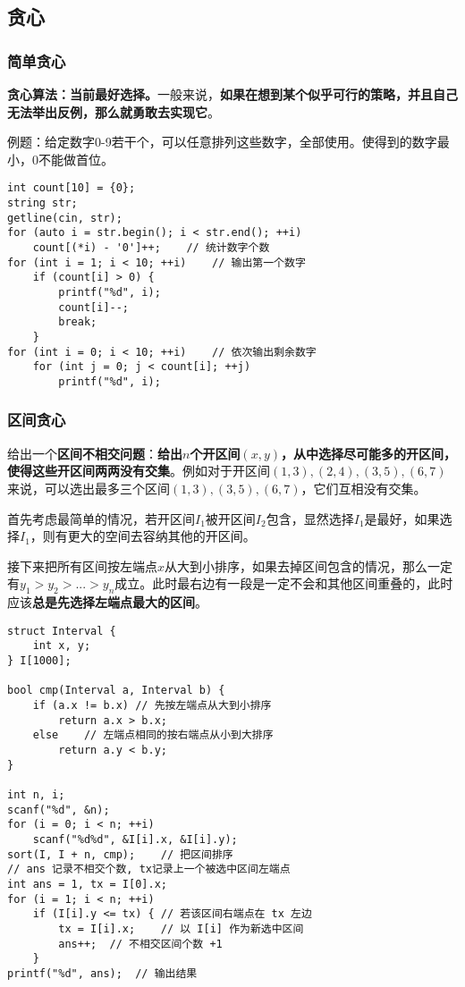 \subsection{贪心}

\subsubsection{简单贪心}

\textbf{贪心算法：当前最好选择。}一般来说，\textbf{如果在想到某个似乎可行的策略，并且自己无法举出反例，那么就勇敢去实现它}。

例题：给定数字0-9若干个，可以任意排列这些数字，全部使用。使得到的数字最小，0不能做首位。

\begin{lstlisting}
int count[10] = {0};
string str;
getline(cin, str);
for (auto i = str.begin(); i < str.end(); ++i)
	count[(*i) - '0']++;	// 统计数字个数
for (int i = 1; i < 10; ++i)	// 输出第一个数字
	if (count[i] > 0) {
		printf("%d", i);
		count[i]--;
		break;
	}
for (int i = 0; i < 10; ++i)	// 依次输出剩余数字
	for (int j = 0; j < count[i]; ++j)
		printf("%d", i);
\end{lstlisting}

\subsubsection{区间贪心}

给出一个\textbf{区间不相交问题}：\textbf{给出$n$个开区间$(x,y)$，从中选择尽可能多的开区间，使得这些开区间两两没有交集}。例如对于开区间$(1,3),(2,4),(3,5),(6,7)$来说，可以选出最多三个区间$(1,3),(3,5),(6,7)$，它们互相没有交集。

首先考虑最简单的情况，若开区间$I_1$被开区间$I_2$包含，显然选择$I_1$是最好，如果选择$I_1$，则有更大的空间去容纳其他的开区间。

接下来把所有区间按左端点$x$从大到小排序，如果去掉区间包含的情况，那么一定有$y_1>y_2>...>y_n$成立。此时最右边有一段是一定不会和其他区间重叠的，此时应该\textbf{总是先选择左端点最大的区间}。

\begin{lstlisting}
struct Interval {
	int x, y;
} I[1000];

bool cmp(Interval a, Interval b) {
	if (a.x != b.x)	// 先按左端点从大到小排序
		return a.x > b.x;
	else	// 左端点相同的按右端点从小到大排序
		return a.y < b.y;
}

int n, i;
scanf("%d", &n);
for (i = 0; i < n; ++i)
	scanf("%d%d", &I[i].x, &I[i].y);
sort(I, I + n, cmp);	// 把区间排序
// ans 记录不相交个数, tx记录上一个被选中区间左端点
int ans = 1, tx = I[0].x;
for (i = 1; i < n; ++i)
	if (I[i].y <= tx) {	// 若该区间右端点在 tx 左边
		tx = I[i].x;	// 以 I[i] 作为新选中区间
		ans++;	// 不相交区间个数 +1
	}
printf("%d", ans);	// 输出结果
\end{lstlisting}

